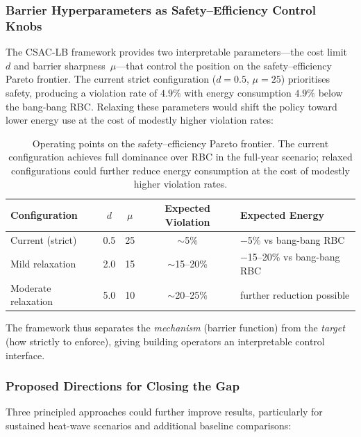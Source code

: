 \subsubsection{Barrier Hyperparameters as Safety--Efficiency Control Knobs}

The CSAC-LB framework provides two interpretable parameters---the cost
limit~$d$ and barrier sharpness~$\mu$---that control the position on the
safety--efficiency Pareto frontier.  The current strict configuration
($d = 0.5$, $\mu = 25$) prioritises safety, producing a violation rate of
$4.9\%$ with energy consumption $4.9\%$ below the bang-bang RBC.  Relaxing
these parameters would shift the policy toward lower energy use at the cost
of modestly higher violation rates:

\begin{table}[htbp]
\centering
\caption{Operating points on the safety--efficiency Pareto frontier.  The
  current configuration achieves full dominance over RBC in the full-year
  scenario; relaxed configurations could further reduce energy consumption
  at the cost of modestly higher violation rates.}
\label{tab:pareto-frontier}
\begin{tabular}{lcccl}
\toprule
\textbf{Configuration}
  & $d$ & $\mu$
  & \textbf{Expected Violation}
  & \textbf{Expected Energy} \\
\midrule
Current (strict)     & 0.5  & 25 & $\sim$5\%     & $-$5\% vs bang-bang RBC \\
Mild relaxation      & 2.0  & 15 & $\sim$15--20\% & $-$15--20\% vs bang-bang RBC \\
Moderate relaxation  & 5.0  & 10 & $\sim$20--25\% & further reduction possible \\
\bottomrule
\end{tabular}
\end{table}

The framework thus separates the \emph{mechanism} (barrier function) from
the \emph{target} (how strictly to enforce), giving building operators an
interpretable control interface.

\subsubsection{Proposed Directions for Closing the Gap}
\label{sec:temp-future-directions}

Three principled approaches could further improve results, particularly
for sustained heat-wave scenarios and additional baseline comparisons:

